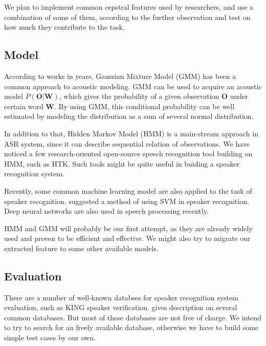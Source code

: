 We plan to implement common cepstral features used by researchers, and use a
combination of some of them, according to the further observation and test on how
much they contribute to the task.

\subsection{Model}
According to works in years, Gaussian Mixture Model (GMM)
has been a common approach to acoustic modeling.\cite{GMM}
GMM can be used to acquire an acoustic model $P(\mathbf{O} | \mathbf{W}) $,
which gives the probability of a given observation
$\mathbf{O}$ under certain word $\mathbf{W}$. By using GMM, this
conditional probability can be well estimated by modeling the distribution as
a sum of several normal distribution.

In addition to that, Hidden Markov Model (HMM) is a main-stream approach in ASR system,
since it can describe sequential relation of observations.\cite{SLP}
We have noticed a few research-oriented open-source speech recognition
tool building on HMM, such as HTK\cite{htk}.
Such tools might be quite useful in buiding a speaker recognition system.

Recently, some common machine learning model are also applied to the task of speaker
recognition. \cite{svm} suggested a method of using SVM in speaker recognition.
Deep neural networks are also used in speech processing recently.\cite{deep}

HMM and GMM will probably be our first attempt, as they are already widely used and proven to be
efficient and effective.  We might also try to migrate our extracted feature to
some other available models.

\subsection{Evaluation}
There are a number of well-known databses for speaker recognition system evaluation,
such as KING speaker verification\cite{king}. \cite{database} gives description on
several common databases. But most of these databases are not free of charge.
We intend to try to search for an freely available database,
otherwise we have to build some simple test cases by our own.

